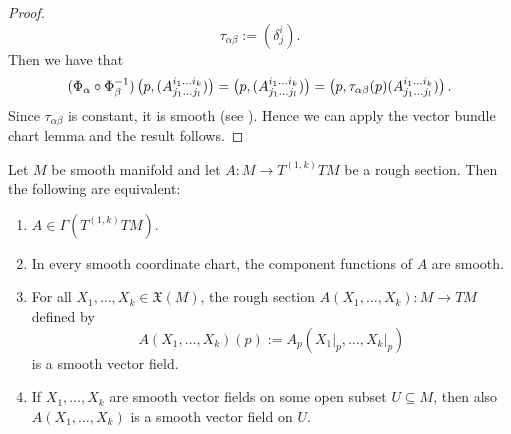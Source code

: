 \begin{proof}
\begin{equation*}
\tau_{\alpha\beta} := (\delta^i_j).
\end{equation*}
Then we have that
\begin{equation*}
(\Phi_\alpha \circ \Phi_\beta^{-1})\del[1]{p,(A^{i_1\dots i_k}_{j_1\dots j_l})} = \del[1]{p,(A^{i_1\dots i_k}_{j_1\dots j_l})} = \del[1]{p,\tau_{\alpha\beta}(p)(A^{i_1\dots i_k}_{j_1\dots j_l})}.
\end{equation*}
Since $\tau_{\alpha\beta}$ is constant, it is smooth (see \cite[36]{lee:smooth_manifolds:2013}). Hence we can apply the vector bundle chart lemma \cite[253]{lee:smooth_manifolds:2013} and the result follows.
\end{proof}

\begin{proposition}
Let $M$ be smooth manifold and let $A : M \to T^{(1,k)}TM$ be a rough section. Then the following are equivalent:
\begin{enumerate}[label = \textup{(}\alph*\textup{)}]
\item $A \in \Gamma(T^{(1,k)}TM)$.
\item In every smooth coordinate chart, the component functions of $A$ are smooth.
\item For all $X_1,\dots,X_k \in \mathfrak{X}(M)$, the rough section $A(X_1,\dots,X_k) : M \to TM$ defined by
\begin{equation}
A(X_1,\dots,X_k)(p) := A_p(X_1\vert_p,\dots,X_k\vert_p)
\end{equation}
\noindent is a smooth vector field.
\item If $X_1,\dots,X_k$ are smooth vector fields on some open subset $U \subseteq M$, then also $A(X_1,\dots,X_k)$ is a smooth vector field on $U$.
\end{enumerate}
\label{prop:smoothness_tensor}
\end{proposition}


